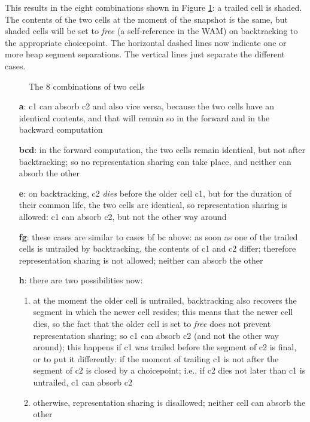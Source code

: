 \documentclass{tlp}
\begin{document}
This results in the eight combinations shown in Figure \ref{fig3}: a
trailed cell is shaded. The contents of the two cells at the moment of
the snapshot is the same, but shaded cells will be set to {\em free}
(a self-reference in the WAM) on backtracking to the appropriate
choicepoint. The horizontal dashed lines now indicate one or more heap
segment separations. The vertical lines just separate the different
cases.
\begin{figure}[h]
\begin{centering}
{}
\caption{The 8 combinations of two cells}
\label{fig3}
\end{centering}
\end{figure}
\begin{enumerate}
\item[{\bf a}:]
c1 can absorb c2 and also vice versa, because the two cells have an
identical contents, and that will remain so in the forward and in the
backward computation
\item[{\bf bcd}:]
in the forward computation, the two cells remain identical, but not
after backtracking; so no representation sharing can take place, and
neither can absorb the other
\item[{\bf e}:]
on backtracking, c2 {\em dies} before the older cell c1, but for the
duration of their common life, the two cells are identical, so
representation sharing is allowed: c1 can absorb c2, but not the other
way around
\item[{\bf fg}:]
these cases are similar to cases {bf bc} above: as soon as one of the
trailed cells is untrailed by backtracking, the contents of c1 and c2
differ; therefore representation sharing is not allowed; neither can
absorb the other
\item[{\bf h}:]
there are two possibilities now:
\begin{enumerate}
\item
at the moment the older cell is untrailed, backtracking also recovers
the segment in which the newer cell resides; this means that the newer
cell dies, so the fact that the older cell is set to {\em free} does
not prevent representation sharing; so c1 can absorb c2 (and not the
other way around); this happens if c1 was trailed before the segment
of c2 is final, or to put it differently: if the moment of trailing c1
is not after the segment of c2 is closed by a choicepoint; i.e., if c2
dies not later than c1 is untrailed, c1 can absorb c2
\item
otherwise, representation sharing is disallowed; neither cell can
absorb the other
\end{enumerate}

\end{enumerate}
\end{document}

